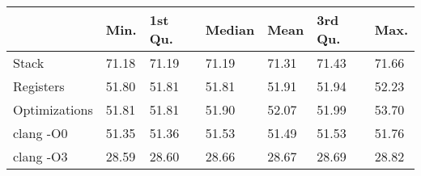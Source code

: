 \begin{table}[ht]
\centering
\begin{tabular}{p{}p{}p{}p{}p{}p{}p{}}
  \hline
 & Min. & 1st Qu. & Median & Mean & 3rd Qu. & Max. \\ 
  \hline
Stack & 71.18 & 71.19 & 71.19 & 71.31 & 71.43 & 71.66 \\ 
  Registers & 51.80 & 51.81 & 51.81 & 51.91 & 51.94 & 52.23 \\ 
  Optimizations & 51.81 & 51.81 & 51.90 & 52.07 & 51.99 & 53.70 \\ 
  clang -O0 & 51.35 & 51.36 & 51.53 & 51.49 & 51.53 & 51.76 \\ 
  clang -O3 & 28.59 & 28.60 & 28.66 & 28.67 & 28.69 & 28.82 \\ 
   \hline
\end{tabular}
\end{table}
